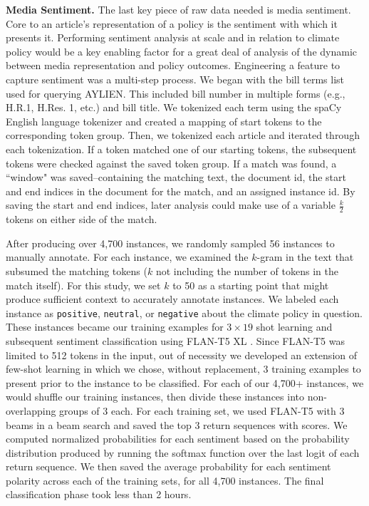 \documentclass[letterpaper,11pt]{article}
\begin{document}
\textbf{Media Sentiment.} The last key piece of raw data needed is media sentiment. Core to an article's representation of a policy is the sentiment with which it presents it. Performing sentiment analysis at scale and in relation to climate policy would be a key enabling factor for a great deal of analysis of the dynamic between media representation and policy outcomes. Engineering a feature to capture sentiment was a multi-step process. We began with the bill terms list used for querying AYLIEN. This included bill number in multiple forms (e.g., H.R.1, H.Res. 1, etc.) and bill title. We tokenized each term using the spaCy English language tokenizer and created a mapping of start tokens to the corresponding token group. Then, we tokenized each article and iterated through each tokenization. If a token matched one of our starting tokens, the subsequent tokens were checked against the saved token group. If a match was found, a ``window" was saved--containing the matching text, the document id, the start and end indices in the document for the match, and an assigned instance id. By saving the start and end indices, later analysis could make use of a variable $\frac{k}{2}$ tokens on either side of the match.

After producing over 4,700 instances, we randomly sampled 56 instances to manually annotate. For each instance, we examined the $k$-gram in the text that subsumed the matching tokens ($k$ not including the number of tokens in the match itself). For this study, we set $k$ to 50 as a starting point that might produce sufficient context to accurately annotate instances. We labeled each instance as \verb|positive|, \verb|neutral|, or \verb|negative| about the climate policy in question. These instances became our training examples for $3 \times 19$ shot learning and subsequent sentiment classification using FLAN-T5 XL \cite{flan-t5-xl}. Since FLAN-T5 was limited to 512 tokens in the input, out of necessity we developed an extension of few-shot learning in which we chose, without replacement, 3 training examples to present prior to the instance to be classified. For each of our 4,700+ instances, we would shuffle our training instances, then divide these instances into non-overlapping groups of 3 each. For each training set, we used FLAN-T5 with 3 beams in a beam search and saved the top 3 return sequences with scores. We computed normalized probabilities for each sentiment based on the probability distribution produced by running the softmax function over the last logit of each return sequence. We then saved the average probability for each sentiment polarity across each of the training sets, for all 4,700 instances. The final classification phase took less than 2 hours.
\end{document}

